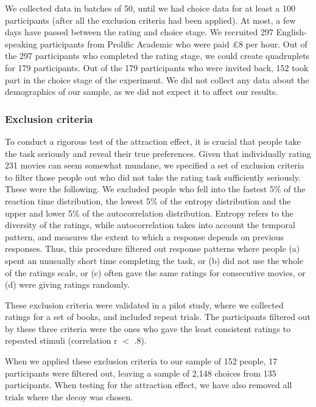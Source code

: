 \documentclass[12pt, a4paper]{article}
\begin{document}
We collected data in batches of 50, until we had choice data for at least a 100 participants (after all the exclusion criteria had been applied). At most, a few days have passed between the rating and choice stage. We recruited 297 English-speaking participants from Prolific Academic who were paid £8 per hour. Out of the 297 participants who completed the rating stage, we could create quadruplets for 179 participants. Out of the 179 participants who were invited back, 152 took part in the choice stage of the experiment. We did not collect any data about the demographics of our sample, as we did not expect it to affect our results.

\subsubsection*{Exclusion criteria} \label{exclusion_ref}

To conduct a rigorous test of the attraction effect, it is crucial that people take the task seriously and reveal their true preferences. Given that individually rating 231 movies can seem somewhat mundane, we specified a set of exclusion criteria to filter those people out who did not take the rating task sufficiently seriously. These were the following. We excluded people who fell into the fastest 5\% of the reaction time distribution, the lowest 5\% of the entropy distribution and the upper and lower 5\% of the autocorrelation distribution. Entropy refers to the diversity of the ratings, while autocorrelation takes into account the temporal pattern, and measures the extent to which a response depends on previous responses. Thus, this procedure filtered out response patterns where people (a) spent an unusually short time completing the task, or (b) did not use the whole of the ratings scale, or (c) often gave the same ratings for consecutive movies, or (d) were giving ratings randomly.

These exclusion criteria were validated in a pilot study, where we collected ratings for a set of books, and included repeat trials. The participants filtered out by these three criteria were the ones who gave the least consistent ratings to repeated stimuli (correlation r $<$ .8).

When we applied these exclusion criteria to our sample of 152 people, 17 participants were filtered out, leaving a sample of 2,148 choices from 135 participants. When testing for the attraction effect, we have also removed all trials where the decoy was chosen.
\end{document}
